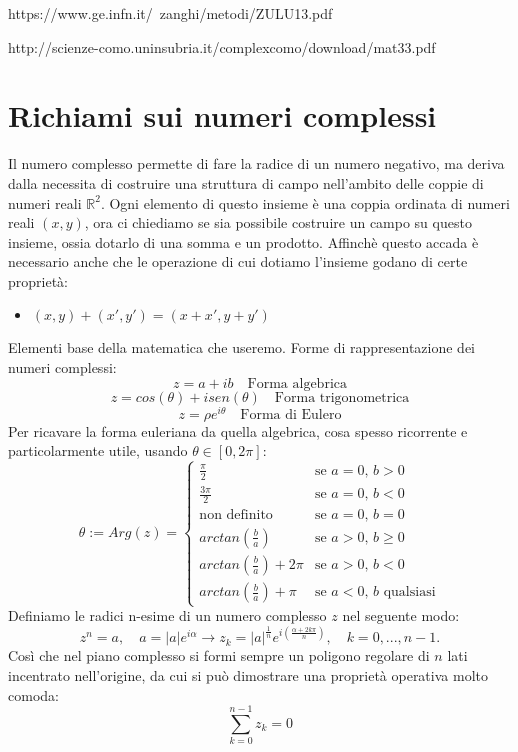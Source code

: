 https://www.ge.infn.it/~zanghi/metodi/ZULU13.pdf

http://scienze-como.uninsubria.it/complexcomo/download/mat33.pdf

\chapter{Richiami sui numeri complessi}

Il numero complesso permette di fare la radice di un numero negativo, ma deriva dalla necessita di costruire una struttura di campo nell'ambito delle coppie di numeri reali $\mathbb{R}^2$. Ogni elemento di questo insieme è una coppia ordinata di numeri reali $(x,y)$, ora ci chiediamo se sia possibile costruire un campo su questo insieme, ossia dotarlo di una somma e un prodotto. Affinchè questo accada è necessario anche che le operazione di cui dotiamo l'insieme godano di certe proprietà:
\begin{itemize}
    \item $(x,y) + (x',y') = (x+x',y+y')$
\end{itemize}

Elementi base della matematica che useremo.
Forme di rappresentazione dei numeri complessi:
\[
z=a+ib \quad \mbox{Forma algebrica}
\]
\[
z=cos(\theta) + isen(\theta) \quad \mbox{Forma trigonometrica}
\]
\[
z=\rho e^{i\theta} \quad \mbox{Forma di Eulero}
\]
Per ricavare la forma euleriana da quella algebrica, cosa spesso ricorrente e particolarmente utile, usando $\theta\in[0,2\pi]$:
\[
\theta:=Arg(z)=
\begin{cases}
\frac{\pi}{2}				& \text{se $a=0, \, b>0$} \\
\frac{3\pi}{2}				& \text{se $a=0, \, b<0$} \\
\mbox{non definito}			& \text{se $a=0, \, b=0$} \\
arctan(\frac{b}{a})			& \text{se $a>0, \, b\ge 0$} \\
arctan(\frac{b}{a})+2\pi	& \text{se $a>0, \, b<0$} \\
arctan(\frac{b}{a})+\pi		& \text{se $a<0, \, b$ qualsiasi}
\end{cases}
\]
Definiamo le radici n-esime di un numero complesso $z$ nel seguente modo:
\begin{equation}
z^n=a, \quad a=|a|e^{i\alpha} \longrightarrow z_k=|a|^{\frac{1}{n}}e^{i(\frac{\alpha + 2k\pi}{n})}, \quad k=0,...,n-1.
\end{equation}
Così che nel piano complesso si formi sempre un poligono regolare di $n$ lati incentrato nell'origine, da cui si può dimostrare una proprietà operativa molto comoda:
\begin{equation}
\sum_{k=0}^{n-1} z_k=0
\end{equation}
